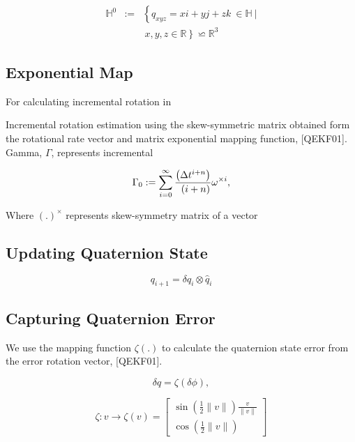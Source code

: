 \documentclass[letterpaper, 10 pt, conference]{ieeeconf}  %
\begin{document}
\begin{eqnarray}\nonumber
\label{eq:11}
\mathbb{H}^{0} &:=& \left\{ q_{xyz}=xi+yj+zk~ \in \mathbb{H}~| \right.\\
&& \left. ~x,y,z \in \mathbb{R} \right\} \backsimeq  \mathbb{R}^3
\end{eqnarray}



\subsection{Exponential Map}

For calculating incremental rotation in

Incremental rotation estimation using the skew-symmetric matrix obtained form
the rotational rate vector and matrix exponential mapping function, [QEKF01].
Gamma, $\Gamma$, represents incremental

\begin{equation}
\label{eq:2}
\Gamma_{0} := \sum_{i=0}^{\infty} \frac{ \left( \Delta t^{i+n}  \right)}{ \\
\left( i + n \right) \! } \\
\omega^{\times i},
\end{equation}

Where $(.)^{\times}$ represents skew-symmetry matrix of a vector


\subsection{Updating Quaternion State}
\begin{equation}
\label{eq:13}
q_{i+1} = \delta q_{i} \otimes \widehat{q}_{i}
\end{equation}



\subsection{Capturing Quaternion Error}
We use the mapping function $\zeta(.)$ to calculate the quaternion
state error from the error rotation vector, [QEKF01].

\begin{equation}
\label{eq:14}
\delta q = \zeta(\delta \phi),
\end{equation}

\begin{equation}
\label{eq:15}
\zeta : v \rightarrow \zeta(v) =
        \begin{bmatrix}
        \sin(\frac{1}{2}\|v\|) \frac{v}{\|v\|} \\
        \cos(\frac{1}{2}\|v\|)
        \end{bmatrix}
\end{equation}
\end{document}
